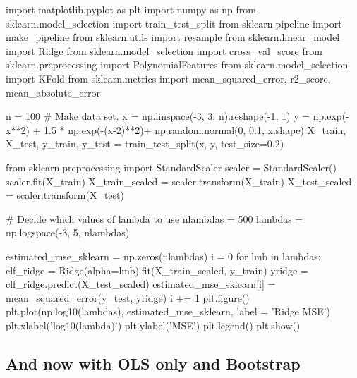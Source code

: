 \documentclass[%
oneside,                 %
final,                   %
10pt]{article}
\begin{document}
\begin{print}
import matplotlib.pyplot as plt
import numpy as np
from sklearn.model_selection import train_test_split
from sklearn.pipeline import make_pipeline
from sklearn.utils import resample
from sklearn.linear_model import Ridge
from sklearn.model_selection import cross_val_score
from sklearn.preprocessing import PolynomialFeatures
from sklearn.model_selection import KFold
from sklearn.metrics import mean_squared_error, r2_score, mean_absolute_error

n = 100
# Make data set.
x = np.linspace(-3, 3, n).reshape(-1, 1)
y = np.exp(-x**2) + 1.5 * np.exp(-(x-2)**2)+ np.random.normal(0, 0.1, x.shape)
X_train, X_test, y_train, y_test = train_test_split(x, y, test_size=0.2)

from sklearn.preprocessing import StandardScaler
scaler = StandardScaler()
scaler.fit(X_train)
X_train_scaled = scaler.transform(X_train)
X_test_scaled = scaler.transform(X_test)



# Decide which values of lambda to use
nlambdas = 500
lambdas = np.logspace(-3, 5, nlambdas)


estimated_mse_sklearn = np.zeros(nlambdas)
i = 0
for lmb in lambdas:
    clf_ridge = Ridge(alpha=lmb).fit(X_train_scaled, y_train)
    yridge = clf_ridge.predict(X_test_scaled)
    estimated_mse_sklearn[i] = mean_squared_error(y_test, yridge)
    i += 1
plt.figure()
plt.plot(np.log10(lambdas), estimated_mse_sklearn, label = 'Ridge MSE')
plt.xlabel('log10(lambda)')
plt.ylabel('MSE')
plt.legend()
plt.show()

\end{print}

\subsection*{And now with OLS only and Bootstrap}
\end{document}
